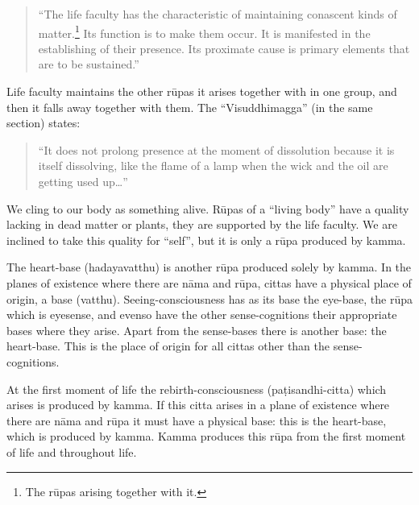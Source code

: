 \documentclass{book}
\begin{document}
\begin{quote}\begin{flushleft}
``The life faculty has the characteristic of maintaining conascent kinds
of matter.\footnote{The r\=upas arising together
with it.} Its function is to make them occur. It is manifested in the
establishing of their presence. Its proximate cause is
primary elements that are to be sustained.''
\end{flushleft}\end{quote}




Life faculty maintains the other r\=upas it arises together with in one
group, and then it falls away together with them. The ``Visuddhimagga''
(in the same section) states:




\begin{quote}\begin{flushleft}
``It does not prolong presence at the moment of dissolution because it
is itself dissolving, like the flame of a lamp when the wick and the
oil are getting used up\ldots''

\end{flushleft}\end{quote}



We cling to our body as something alive. R\=upas of a ``living body''
have a quality lacking in dead matter or plants, they are supported by
the life faculty. We are inclined to take this quality for ``self'',
but it is only a r\=upa produced by kamma.

The heart-base (hadayavatthu) is another r\=upa produced solely by
kamma. In the planes of existence where there are n{\=a}ma and r\=upa,
cittas have a physical place of origin, a base (vatthu).
Seeing-consciousness has as its base the eye-base, the r\=upa which
is eyesense, and evenso have the other sense-cognitions their
appropriate bases where they arise. Apart from the sense-bases there
is another base: the heart-base. This is the place of origin for all
cittas other than the sense-cognitions.

At the first moment of life the rebirth-consciousness
(pa\d tisan\-dhi-citta) which arises is produced by kamma. If this citta
arises in a plane of existence where there are n{\=a}ma and r\=upa it
must have a physical base: this is the heart-base, which is produced
by kamma. Kamma produces this r\=upa from the first moment of life and
throughout life.
\end{document}
